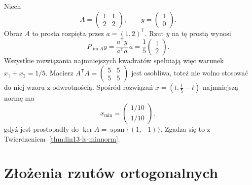 \begin{przyklad}
\label{prz:lin13-rank-deficient}
Niech
\[
 A=\begin{pmatrix}1&1\\2&2\end{pmatrix},
 \qquad
 y=\begin{pmatrix}1\\0\end{pmatrix}.
\]
Obraz \(A\) to prosta
rozpięta przez \(a=(1,2)^{\mathsf T}\).
Rzut \(y\) na tę prostą wynosi
\[
 P_{\operatorname{im}A}y
 =\frac{a^{\mathsf T}y}{a^{\mathsf T}a}\,a
 =\frac15\begin{pmatrix}1\\2\end{pmatrix}.
\]
Wszystkie rozwiązania
najmniejszych kwadratów
spełniają więc warunek
\(x_1+x_2=1/5\).
Macierz \(A^{\mathsf T}A
=\begin{pmatrix}5&5\\5&5\end{pmatrix}\)
jest osobliwa, toteż nie wolno
stosować do niej wzoru
z odwrotnością.
Spośród rozwiązań
\(x=(t,\frac15-t)\)
najmniejszą normę ma
\[
 x_{\min}=\begin{pmatrix}1/10\\1/10\end{pmatrix},
\]
gdyż jest prostopadły do
\(\ker A=\operatorname{span}\{(1,-1)\}\).
Zgadza się to z
Twierdzeniem~\ref{thm:lin13-ls-minnorm}.
\end{przyklad}

\section{Złożenia rzutów ortogonalnych}
\label{sec:lin13-rzuty-zlozenia}

